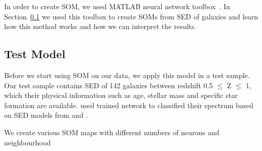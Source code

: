     In order to create SOM, we used {\tiny MATLAB} neural network toolbox~\citep{sommatlab}. 
    In Section~\ref{sec: test model} we used this toolbox to create SOMs from SED of galaxies and learn how this method works and how we can interpret the results.
   
 \subsection{Test Model}
 \label{sec: test model}
    Before we start using SOM on our data, we apply this model in a test sample. 
    Our test sample contains SED of 142 galaxies between redshift 0.5 $ \leq$ Z $\leq $ 1, which their physical information such as age, stellar mass and specific star formation are available. 
    \cite{Hossein12} used trained network to classified their spectrum based on SED models from \cite{Kinney96} and \cite{Coleman80}.
    
    We create various SOM maps with different numbers of neurons and neighbourhood 
